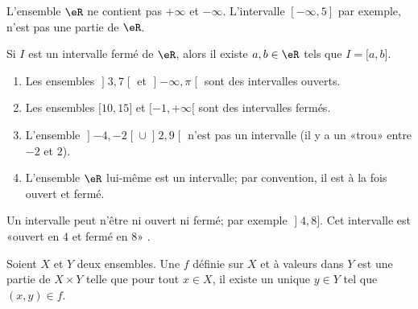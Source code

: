 \begin{remark}
	L'ensemble \( \eR\) ne contient pas \( +\infty\) et \( -\infty\). L'intervalle \( [-\infty, 5]\) par exemple, n'est pas une partie de \( \eR\).
\end{remark}

\begin{proposition}	\label{PROPooBWXYooDcwXrp}
	Si \( I\) est un intervalle fermé de \( \eR\), alors il existe \( a,b\in \eR\) tels que \( I=\mathopen[ a,b\mathclose]\).
\end{proposition}

\begin{example}
	\begin{enumerate}
		\item
		      Les ensembles \( \mathopen] 3 , 7 \mathclose[\) et \( \mathopen] -\infty , \pi \mathclose[\) sont des intervalles ouverts.
		\item
		      Les ensembles \( \mathopen[ 10 , 15 \mathclose]\) et \( \mathopen[ -1 , +\infty [\) sont des intervalles fermés.
		\item
		      L'ensemble \( \mathopen] -4 , -2 \mathclose[\cup\mathopen] 2 , 9 \mathclose[\) n'est pas un intervalle (il y a un «trou» entre \(- 2\) et \( 2\)).
		\item
		      L'ensemble \( \eR\) lui-même est un intervalle; par convention, il est à la fois ouvert et fermé.
	\end{enumerate}
	Un intervalle peut n'être ni ouvert ni fermé; par exemple \( \mathopen] 4 , 8 \mathclose]\). Cet intervalle est «ouvert en \( 4\) et fermé en \( 8\)» .
\end{example}

\begin{definition}
	Soient \( X\) et \( Y\) deux ensembles. Une  \( f\) définie sur \( X\) et à valeurs dans \( Y\) est une partie de \( X\times Y\) telle que pour tout \( x\in X\), il existe un unique \( y\in Y\) tel que \( (x,y)\in f\).
\end{definition}

